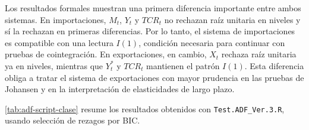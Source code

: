 \documentclass[11pt,a4paper]{article}
\begin{document}
	Los resultados formales muestran una primera diferencia importante entre ambos
	sistemas. En importaciones, \(M_t\), \(Y_t\) y \(TCR_t\) no rechazan raíz
	unitaria en niveles y sí la rechazan en primeras diferencias. Por lo tanto, el
	sistema de importaciones es compatible con una lectura \(I(1)\), condición
	necesaria para continuar con pruebas de cointegración. En exportaciones, en
	cambio, \(X_t\) rechaza raíz unitaria ya en niveles, mientras que \(Y_t^*\) y
	\(TCR_t\) mantienen el patrón \(I(1)\). Esta diferencia obliga a tratar el
	sistema de exportaciones con mayor prudencia en las pruebas de Johansen y en la
	interpretación de elasticidades de largo plazo.
	
	\autoref{tab:adf-script-clase} resume los resultados obtenidos con
	\texttt{Test.ADF\_Ver.3.R}, usando selección de rezagos por BIC.
	
\end{document}
